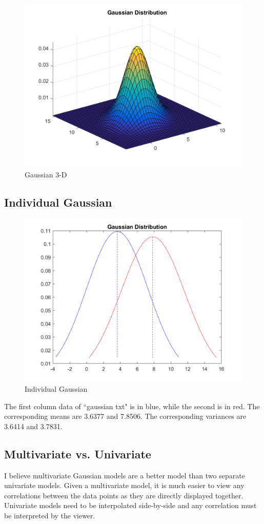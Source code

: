 \documentclass[12pt, letterpaper]{report}
\begin{document}
\begin{figure}[H]
	\centering
	\includegraphics[width=0.7\columnwidth]{p2b.png}
	\caption{Gaussian 3-D}
\end{figure}

\subsection{Individual Gaussian}

\begin{figure}[H]
	\centering
	\includegraphics[width=0.7\columnwidth]{p2c.png}
	\caption{Individual Gaussian}
\end{figure}

The first column data of ``gaussian txt" is in blue, while the second is in red.  The corresponding means are 3.6377 and 7.8506.  The corresponding variances are 3.6414 and 3.7831.

\subsection{Multivariate vs. Univariate}

I believe multivariate Gaussian models are a better model than two separate univariate models. Given a multivariate model, it is much easier to view any correlations between the data points as they are directly displayed together. Univariate models need to be interpolated side-by-side and any correlation must be interpreted by the viewer.
\end{document}
